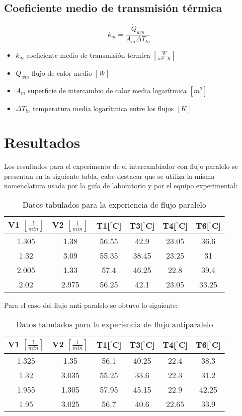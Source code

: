 \documentclass[letterpaper,11pt]{article} %
\begin{document}
\subsection{Coeficiente medio de transmisión térmica}
\begin{equation}
k_m = \frac{\dot{Q}_{wm}}{A_m \Delta T_{ln}}
\end{equation}
\begin{itemize}
	\item $k_m$ coeficiente medio de transmisión térmica $[\frac{W}{m^2\cdot K}]$
	\item $\dot{Q}_{wm}$ flujo de calor medio $[W]$
	\item $A_m$ superficie de intercambio de calor media logarítmica $[m^2]$
	\item $\Delta T_{ln}$ temperatura media logarítmica entre los flujos $[K]$
	
\end{itemize}
\newpage
\section{Resultados}
Los resultados para el experimento de el intercambiador con flujo paralelo se presentan en la siguiente tabla, cabe destacar que se utiliza la misma nomenclatura usada por la guía de laboratorio y por el equipo experimental:
\newp
\begin{table}[htbp]
    \centering
    
    \caption{Datos tabulados para la experiencia de flujo paralelo}
    \begin{tabular}{c|c|c|c|c|c}
    V1 $[\frac{l}{min}]$ & V2 $[\frac{l}{min}]$ &T1[$^{°}$C]& T3[$^{°}$C]&T4[$^{°}$C]&T6[$^{°}$C]\\
        \hline
        1.305 & 1.38 & 56.55 &42.9 &23.05 &36.6\\
        1.32 & 3.09 & 55.35 &38.45 &23.25 &31\\
        2.005 & 1.33 & 57.4 &46.25 &22.8 &39.4\\
        2.02 & 2.975 & 56.25 &42.1 &23.05 &33.25\\
    \end{tabular}
    \label{tab:paralelo}
\end{table}
\newp
Para el caso del flujo anti-paralelo se obtuvo lo siguiente:
\begin{table}[htbp]
    \centering
    \caption{Datos tabulados para la experiencia de flujo antiparalelo}
    \begin{tabular}{c|c|c|c|c|c}
    
        V1 $[\frac{l}{min}]$ & V2 $[\frac{l}{min}]$ &T1[$^{°}$C]& T3[$^{°}$C]&T4[$^{°}$C]&T6[$^{°}$C]\\
        \hline
        1.325 & 1.35 & 56.1 &40.25 &22.4 &38.3\\
        1.32 & 3.035 & 55.25 &33.6 &22.3 &31.2\\
        1.955 & 1.305 & 57.95 &45.15 &22.9 &42.25\\
        1.95 & 3.025 & 56.7 &40.6 &22.65 &33.9\\
    \end{tabular}
    \label{tab:antiparalelo}
\end{table}
\end{document}
